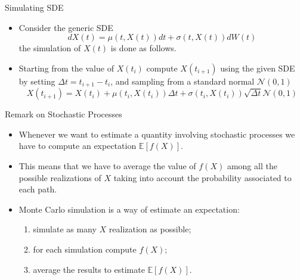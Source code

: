\documentclass{beamer}
\begin{document}
\begin{frame}{Simulating SDE}
\begin{itemize}
\item  Consider the generic SDE
\begin{equation*}
dX(t) = \mu(t,X(t))dt + \sigma(t,X(t))dW(t)
\end{equation*}
the simulation of $X(t)$ is done as follows.
\item Starting from the value of $X(t_i)$ compute $X(t_{i+1})$ using the given SDE by setting $\Delta t = t_{i+1} - t_{i}$, and sampling from a standard normal $\mathcal{N}(0,1)$
\begin{equation*}
X(t_{i+1}) = X(t_i) + \mu(t_i,X(t_i))\Delta t + \sigma(t_i,X(t_i))\sqrt{\Delta t}\mathcal{N}(0,1)
\end{equation*}
\end{itemize}
\end{frame}

\begin{frame}{Remark on Stochastic Processes}
\begin{itemize}
\item Whenever we want to estimate a quantity involving stochastic processes we have to compute an expectation $\mathbb{E}[f(X)]$.
\item This means that we have to average the value of $f(X)$ among all the possible realizations of $X$ taking into account the probability associated to each path.
\item Monte Carlo simulation is a way of estimate an expectation: 
\begin{enumerate}
\item simulate as many $X$ realization as possible;
\item for each simulation compute $f(X)$;
\item average the results to estimate $\mathbb{E}[f(X)]$.
\end{enumerate}
\end{itemize}
\end{frame}
\end{document}

